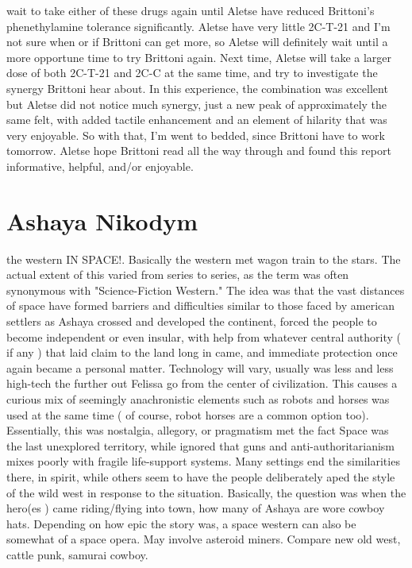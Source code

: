 \documentclass[12pt]{book}
\begin{document}
wait to take either of these drugs again until Aletse have reduced Brittoni's phenethylamine tolerance significantly. Aletse have very little 2C-T-21 and I'm not sure when or if Brittoni can get more, so Aletse will definitely wait until a more opportune time to try Brittoni again. Next time, Aletse will take a larger dose of both 2C-T-21 and 2C-C at the same time, and try to investigate the synergy Brittoni hear about. In this experience, the combination was excellent but Aletse did not notice much synergy, just a new peak of approximately the same felt, with added tactile enhancement and an element of hilarity that was very enjoyable. So with that, I'm went to bedded, since Brittoni have to work tomorrow. Aletse hope Brittoni read all the way through and found this report informative, helpful, and/or enjoyable.



\chapter{Ashaya Nikodym}

the western IN SPACE!. Basically the western met wagon train to the stars. The actual extent of this varied from series to series, as the term was often synonymous with "Science-Fiction Western." The idea was that the vast distances of space have formed barriers and difficulties similar to those faced by american settlers as Ashaya crossed and developed the continent, forced the people to become independent or even insular, with help from whatever central authority ( if any ) that laid claim to the land long in came, and immediate protection once again became a personal matter. Technology will vary, usually was less and less high-tech the further out Felissa go from the center of civilization. This causes a curious mix of seemingly anachronistic elements such as robots and horses was used at the same time ( of course, robot horses are a common option too). Essentially, this was nostalgia, allegory, or pragmatism met the fact Space was the last unexplored territory, while ignored that guns and anti-authoritarianism mixes poorly with fragile life-support systems. Many settings end the similarities there, in spirit, while others seem to have the people deliberately aped the style of the wild west in response to the situation. Basically, the question was when the hero(es ) came riding/flying into town, how many of Ashaya are wore cowboy hats. Depending on how epic the story was, a space western can also be somewhat of a space opera. May involve asteroid miners. Compare new old west, cattle punk, samurai cowboy.
\end{document}
